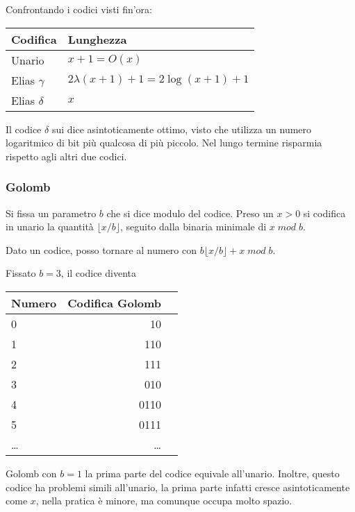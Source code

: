 Confrontando i codici visti fin'ora: 
\begin{center}
    \begin{tabular}{|l | l |}
        \hline
        Codifica & Lunghezza\\
        \hline
        Unario & $x+1 = O(x)$\\
        Elias $\gamma$ & $2\lambda (x+1) + 1 = 2\log (x+1) + 1$\\
        Elias $\delta$ & $x$\\ 
        \hline
    \end{tabular}
\end{center}

Il codice $\delta$ sui dice asintoticamente ottimo, visto che utilizza 
un numero logaritmico di bit più qualcosa di più piccolo. 
Nel lungo termine risparmia rispetto agli altri due codici.

\subsubsection{Golomb}

Si fissa un parametro $b$ che si dice modulo del codice. Preso un 
$x > 0$ si codifica in unario la quantità $\lfloor x/ b \rfloor$, 
seguito dalla binaria minimale di $x\;\textit{mod}\;b$.

Dato un codice, posso tornare al numero con $b\lfloor x/ b \rfloor + x\;\textit{mod}\;b$.

Fissato $b = 3$, il codice diventa 

\begin{center}
    \begin{tabular}{|l | r | r |}
        \hline
        Numero & Codifica Golomb \\
        \hline
        0 & 10\\
        1 & 110\\
        2 & 111\\ 
        3 & 010\\ 
        4 & 0110\\ 
        5 & 0111\\ 
        \dots & \dots\\
        \hline
    \end{tabular}
\end{center}

\begin{remark}
    Golomb con $b = 1$ la prima parte del codice equivale all'unario. Inoltre, questo codice ha problemi simili all'unario, 
    la prima parte infatti cresce asintoticamente come $x$, 
    nella pratica è minore, ma comunque occupa molto spazio. 
\end{remark}

